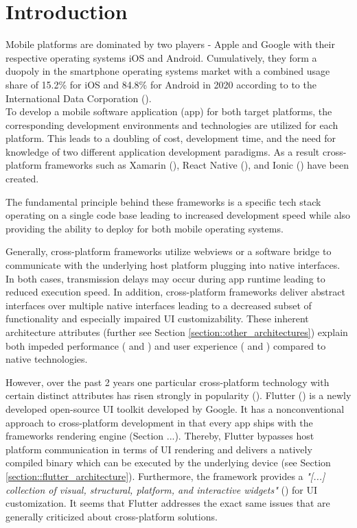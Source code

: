 \chapter{Introduction}
\label{section:introduction}
Mobile platforms are dominated by two players - Apple and Google with their respective operating systems iOS and Android. 
Cumulatively, they form a duopoly in the smartphone operating systems market with a combined usage share of 
15.2\% for iOS and 84.8\% for Android in 2020 according to to the International Data Corporation (\cite{IDC2021}).
\\To develop a mobile software application (app) for both target platforms, the corresponding development environments and technologies 
are utilized for each platform. This leads to a doubling of cost, development time, and 
the need for knowledge of two different application development paradigms. 
As a result cross-platform frameworks such as Xamarin (\cite{Xamarin2021}), React Native (\cite{Facebook2021}), and Ionic (\cite{Ionic2021}) have been created. 

The fundamental principle behind these frameworks is a specific tech stack operating on a single code base leading to increased development speed
while also providing the ability to deploy for both mobile operating systems.

Generally, cross-platform frameworks utilize webviews or a software bridge to communicate with the underlying host platform plugging into 
native interfaces. In both cases, transmission delays may occur during app runtime leading to reduced execution speed. In addition, 
cross-platform frameworks deliver abstract interfaces over multiple native interfaces leading to a decreased subset of functionality
and especially impaired UI customizability. These inherent architecture attributes (further see Section \ref{section::other_architectures}) explain
both impeded performance (\cite{Ebone2018} and \cite{Corbalan2019}) and user experience (\cite{Mercado2016} and \cite{Angulo2014}) compared to native technologies.

However, over the past 2 years one particular cross-platform technology with certain distinct attributes has risen strongly in popularity (\cite{Statista2021}).
Flutter (\cite{FlutterDev20}) is a newly developed open-source UI toolkit developed by Google. 
It has a nonconventional approach to cross-platform development in that every app ships with the frameworks rendering engine (Section ...). 
Thereby, Flutter bypasses host platform communication in terms of UI rendering and delivers a natively compiled binary 
which can be executed by the underlying device (see Section \ref{section::flutter_architecture}).
Furthermore, the framework provides a \textit{"[...] collection of visual, structural, platform, and interactive widgets"} (\textcite{GoogleWidgets2021}) for UI customization.
It seems that Flutter addresses the exact same issues that are generally criticized about cross-platform solutions.

